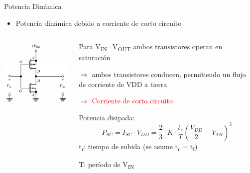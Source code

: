 \documentclass[aspectratio=169,t]{beamer}
\begin{document}
\begin{frame}{Potencia Dinámica}
\begin{itemize}
	\item Potencia dinámica debido a corriente de corto circuito
\end{itemize}

\begin{columns}

	\begin{column}{0.5\textwidth}
 
		\centering
		\includegraphics[width=5cm]{pdynamic}
  
	\end{column}
 
	\begin{column}{0.5\textwidth}
 
		Para V\textsubscript{IN}=V\textsubscript{OUT} ambos transistores operan en saturación
		
		$\Rightarrow$ ambos transistores conducen, permitiendo un flujo de corriente de VDD a tierra
		
		\textcolor{red}{$\Rightarrow$ Corriente de corto circuito}
		
		\vspace{3mm}
		Potencia disipada:
		\[ P_{SC} = I_{SC} \cdot V_{DD} = \dfrac{2}{3} \cdot K \cdot \dfrac{t_r}{T} \left(\dfrac{V_{DD}}{2} - V_{TH}\right)^3 \]
		t\textsubscript{r}: tiempo de subida (se asume t\textsubscript{r} = t\textsubscript{f})
		
		T: período de V\textsubscript{IN}
  
	\end{column}
 
\end{columns}

\end{frame}
\end{document}
